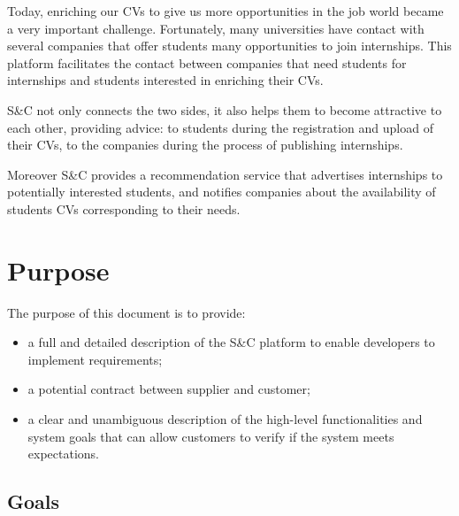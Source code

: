 Today, enriching our CVs to give us more opportunities in the job world became a very important challenge. 
Fortunately, many universities have contact with several companies that offer students many opportunities to join internships.
This platform facilitates the contact between companies that need students for internships and students interested in enriching their CVs.

S\&C not only connects the two sides, it also helps them to become attractive to each other, providing advice: to students during the registration and upload of their CVs, to the companies during the process of publishing internships.

Moreover S\&C provides a recommendation service that advertises internships to potentially interested students, and notifies companies about the availability of students CVs corresponding to their needs.

\section{Purpose}
\label{sec:purpose}%
The purpose of this document is to provide:
\begin{itemize}
    \item a full and detailed description of the S\&C platform to enable developers to                   implement requirements;
    \item a potential contract between supplier and customer;
    \item a clear and unambiguous description of the high-level functionalities and                   system goals that can allow customers to verify if the system meets                               expectations.
\end{itemize}

\newpage

\subsection{Goals}
\label{subsec:goals}%
\setcounter{g}{1}
\newcommand{\cg}{\theg\stepcounter{g}}

